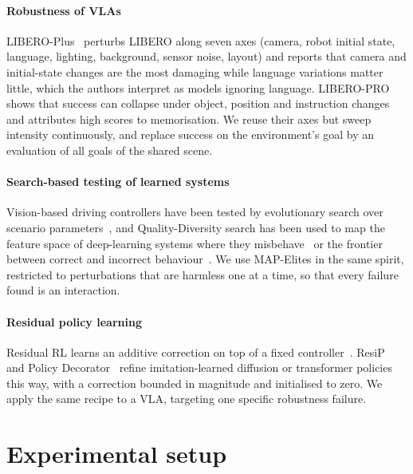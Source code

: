 \documentclass[10pt,twocolumn,letterpaper]{article}
\begin{document}
\paragraph{Robustness of VLAs} LIBERO-Plus~\citep{fei2025liberoplus} perturbs LIBERO along seven axes
(camera, robot initial state, language, lighting, background, sensor noise, layout) and reports that
camera and initial-state changes are the most damaging while language variations matter little, which the
authors interpret as models ignoring language. LIBERO-PRO~\citep{zhou2025liberopro} shows that success can
collapse under object, position and instruction changes and attributes high scores to memorisation. We
reuse their axes but sweep intensity continuously, and replace success on the environment's goal by an
evaluation of all goals of the shared scene.

\paragraph{Search-based testing of learned systems} Vision-based driving controllers have been tested
by evolutionary search over scenario parameters~\citep{abdessalem2018testing}, and Quality-Diversity
search has been used to map the feature space of deep-learning systems where they
misbehave~\citep{zohdinasab2021deephyperion} or the frontier between correct and incorrect
behaviour~\citep{riccio2020deepjanus}. We use MAP-Elites in the same spirit, restricted to perturbations that
are harmless one at a time, so that every failure found is an interaction.

\paragraph{Residual policy learning} Residual RL learns an additive correction on top of a fixed
controller~\citep{silver2018residual,johannink2019residual}. ResiP~\citep{ankile2024resip} and Policy
Decorator~\citep{yuan2024policydecorator} refine imitation-learned diffusion or transformer policies this
way, with a correction bounded in magnitude and initialised to zero. We apply the same recipe to a VLA,
targeting one specific robustness failure.

\section{Experimental setup}
\end{document}

